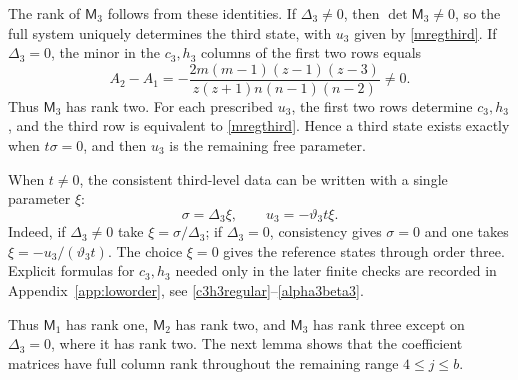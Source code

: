 \documentclass[12pt]{article}
\theoremstyle{remark}
\begin{document}
The rank of $\mathsf M_3$ follows from these identities.  If $\Delta_3\ne0$, then
$\det \mathsf M_3\ne0$, so the full system uniquely determines the third state, with $u_3$
given by \eqref{mregthird}.  If $\Delta_3=0$, the minor in the
$c_3,h_3$ columns of the first two rows equals
\[
 A_2-A_1=
 -\frac{2m(m-1)(z-1)(z-3)}{z(z+1)n(n-1)(n-2)}\ne0.
\]
Thus $\mathsf M_3$ has rank two.  For each prescribed $u_3$, the first two
rows determine $c_3,h_3$, and the third row is equivalent to
\eqref{mregthird}.  Hence a third state exists exactly when
$t\sigma=0$, and then $u_3$ is the remaining free parameter.

When $t\ne0$, the consistent third-level data can be written with a
single parameter $\xi$:
\begin{equation}\label{mregxi}
 \sigma=\Delta_3\xi,\qquad
 u_3=-\vartheta_3t\xi.
\end{equation}
Indeed, if $\Delta_3\ne0$ take $\xi=\sigma/\Delta_3$; if
$\Delta_3=0$, consistency gives $\sigma=0$ and one takes
$\xi=-u_3/(\vartheta_3t)$.  The choice $\xi=0$ gives the reference
states through order three.  Explicit formulas for $c_3,h_3$ needed
only in the later finite checks are recorded in
Appendix~\ref{app:loworder}, see \eqref{c3h3regular}--\eqref{alpha3beta3}.

Thus $\mathsf M_1$ has rank one, $\mathsf M_2$ has rank two, and
$\mathsf M_3$ has rank three except on $\Delta_3=0$, where it has
rank two.  The next lemma shows that the coefficient matrices have
full column rank throughout the remaining range $4\le j\le b$.
\end{document}

